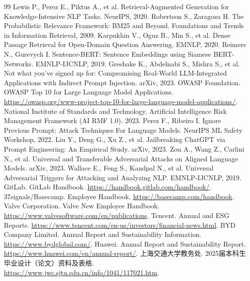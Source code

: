 \documentclass[UTF8,a4paper,zihao=-4]{ctexart}
\begin{document}
\newpage
\begin{thebibliography}{99}
 Lewis P., Perez E., Piktus A., et al. Retrieval-Augmented Generation for Knowledge-Intensive NLP Tasks. NeurIPS, 2020.
 Robertson S., Zaragoza H. The Probabilistic Relevance Framework: BM25 and Beyond. Foundations and Trends in Information Retrieval, 2009.
 Karpukhin V., Oguz B., Min S., et al. Dense Passage Retrieval for Open-Domain Question Answering. EMNLP, 2020.
 Reimers N., Gurevych I. Sentence-BERT: Sentence Embeddings using Siamese BERT-Networks. EMNLP-IJCNLP, 2019.
 Greshake K., Abdelnabi S., Mishra S., et al. Not what you've signed up for: Compromising Real-World LLM-Integrated Applications with Indirect Prompt Injection. arXiv, 2023.
 OWASP Foundation. OWASP Top 10 for Large Language Model Applications. \url{https://owasp.org/www-project-top-10-for-large-language-model-applications/}.
 National Institute of Standards and Technology. Artificial Intelligence Risk Management Framework (AI RMF 1.0). 2023.
 Perez F., Ribeiro I. Ignore Previous Prompt: Attack Techniques For Language Models. NeurIPS ML Safety Workshop, 2022.
 Liu Y., Deng G., Xu Z., et al. Jailbreaking ChatGPT via Prompt Engineering: An Empirical Study. arXiv, 2023.
 Zou A., Wang Z., Carlini N., et al. Universal and Transferable Adversarial Attacks on Aligned Language Models. arXiv, 2023.
 Wallace E., Feng S., Kandpal N., et al. Universal Adversarial Triggers for Attacking and Analyzing NLP. EMNLP-IJCNLP, 2019.
 GitLab. GitLab Handbook. \url{https://handbook.gitlab.com/handbook/}.
 37signals/Basecamp. Employee Handbook. \url{https://basecamp.com/handbook}.
 Valve Corporation. Valve New Employee Handbook. \url{https://www.valvesoftware.com/en/publications}.
 Tencent. Annual and ESG Reports. \url{https://www.tencent.com/en-us/investors/financial-news.html}.
 BYD Company Limited. Annual Report and Sustainability Information. \url{https://www.bydglobal.com/}.
 Huawei. Annual Report and Sustainability Report. \url{https://www.huawei.com/en/annual-report/}.
 上海交通大学教务处. 2025届本科生毕业设计（论文）资料及表格. \url{https://www.jwc.sjtu.edu.cn/info/1041/117021.htm}.
\end{thebibliography}
\end{document}
